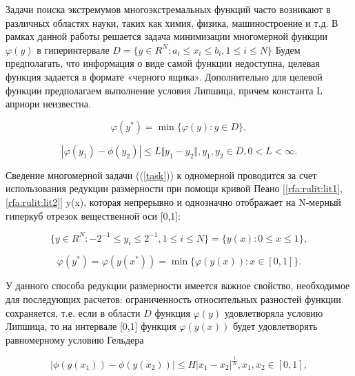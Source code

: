 \documentclass[10pt,a4paper]{book}
\begin{document}
Задачи поиска экстремумов многоэкстремальных функций часто возникают в различных областях науки, таких как химия, физика, машиностроение и т.д. В рамках данной работы решается задача минимизации многомерной функции $\varphi(y)$ в гиперинтервале \(D=\{y\in R^N:a_i\leqslant x_i\leqslant{b_i}, 1\leqslant{i}\leqslant{N}\}\)  Будем предполагать, что информация о виде самой функции недоступна, целевая функция задается в формате «черного ящика». Дополнительно для целевой функции предполагаем выполнение условия Липшица, причем константа L априори неизвестна. 
 
 
\begin{equation}
\label{task}
\varphi(y^*)=\min\{\varphi(y):y\in D\},
\end{equation}

\begin{equation}
\label{lip}
|\varphi(y_1)-\phi(y_2)|\leqslant L\Vert y_1-y_2\Vert,y_1,y_2\in D,0<L<\infty.
\end{equation}



 
Сведение многомерной задачи ((\ref{task})) к одномерной проводится за счет использования редукции размерности при помощи кривой Пеано [\ref{rfa:rulit:lit1}, \ref{rfa:rulit:lit2}] y(x), которая непрерывно и однозначно отображает на N-мерный гиперкуб отрезок вещественной оси [0,1]:
 
\begin{equation}
\label{cube}
\lbrace y\in R^N:-2^{-1}\leqslant y_i\leqslant 2^{-1}, 1\leqslant i\leqslant N\rbrace=\{y(x): 0\leqslant x\leqslant 1\},
\end{equation}


\begin{equation}
\label{oneDimTask}
\varphi(y^*)=\varphi(y(x^*))=\min\{\varphi(y(x)): x\in [0,1]\}.
\end{equation}

 
 
 У данного способа редукции размерности имеется важное свойство, необходимое для последующих расчетов: ограниченность относительных разностей функции сохраняется, т.е. если в области $D$ функция $\varphi(y)$ удовлетворяла условию Липшица, то на интервале [0,1] функция $\varphi(y(x))$ будет удовлетворять равномерному условию Гельдера
 
\begin{equation}
\label{holder}
|\phi(y(x_1))-\phi(y(x_2))|\leqslant H{|x_1-x_2|}^{\frac{1}{N}}, 
 x_1,x_2\in[0,1],
\end{equation}
\end{document}
